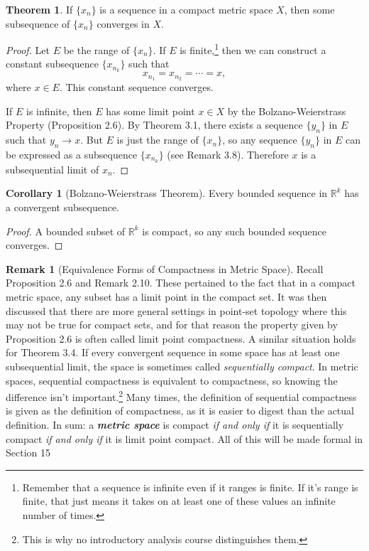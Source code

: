 \documentclass{article}
\newcommand{\R}{\mathbb{R}}
\theoremstyle{definition}
\newtheorem{theorem}{Theorem}[section]
\newtheorem{corollary}{Corollary}[section]
\newtheorem{remark}{Remark}[section]
\begin{document}
	\begin{theorem}
		If $ \{x_n\} $ is a sequence in a compact metric space $ X $, then some subsequence of $ \{x_n\} $ converges in $ X $. 
	\end{theorem}
	\begin{proof}
		Let $ E $ be the range of $ \{x_n\} $. If $ E $ is finite,\footnote{Remember that a sequence is infinite even if it ranges is finite. If it's range is finite, that just means it takes on at least one of these values an infinite number of times.} then we can construct a constant subsequence $ \{x_{n_k}\} $ such that $$x_{n_1}=x_{n_2}=\cdots= x ,$$ where $ x\in E $. This constant sequence converges.
		
		If $ E $ is infinite, then $ E $ has some limit point $ x\in X $ by the Bolzano-Weierstrass Property (Proposition 2.6). By Theorem 3.1, there exists a sequence $ \{y_n\} $ in $ E $ such that $ y_n\to x $. But $ E $ is just the range of $ \{x_n\} $, so any sequence $ \{y_n\} $ in $ E $ can be expressed as a subsequence $ \{x_{n_k}\} $ (see Remark 3.8). Therefore $ x $ is a subsequential limit of $ {x_n} $.  
	\end{proof}
	\begin{corollary}[Bolzano-Weierstrass Theorem]
		Every bounded sequence in $ \R^k $ has a convergent subsequence. 
	\end{corollary}
	\begin{proof}
		A bounded subset of $ \R^k $ is compact, so any such bounded sequence converges. 
	\end{proof}
	\begin{remark}[Equivalence Forms of Compactness in Metric Space]
		Recall Proposition 2.6 and Remark 2.10. These pertained to the fact that in a compact metric space, any subset has a limit point in the compact set. It was then discussed that there are more general settings in point-set topology where this may not be true for compact sets, and for that reason the property given by Proposition 2.6 is often called limit point compactness. A similar situation holds for Theorem 3.4. If every convergent sequence in some space has at least one subsequential limit, the space is sometimes called \textit{\color{red}sequentially compact}. In metric spaces, sequential compactness is equivalent to compactness, so knowing the difference isn't important.\footnote{This is why no introductory analysis course distinguishes them.} Many times, the definition of sequential compactness is given as the definition of compactness, as it is easier to digest than the actual definition. In sum: a \textit{\textbf{metric space}} is compact \textit{if and only if} it is sequentially compact \textit{if and only if} it is limit point compact. All of this will be made formal in Section 15 
	\end{remark}
\end{document}
